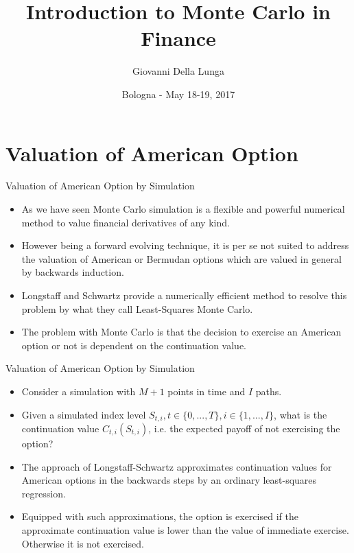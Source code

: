 \documentclass[11pt]{beamer}
\author{Giovanni Della Lunga}
\title{Introduction to Monte Carlo in Finance}
\institute{WORKSHOP IN QUANTITATIVE FINANCE}
\date{Bologna - May 18-19, 2017}
\begin{document}
\begin{frame}
\titlepage
\end{frame}


\section{Valuation of American Option}
\begin{frame}{Valuation of American Option by Simulation}
\begin{itemize}
\item As we have seen Monte Carlo simulation is a flexible and powerful numerical method to value financial derivatives of any kind. 
\item However being a forward evolving technique, it is per se not suited to address the valuation of American or Bermudan options which are valued in general by backwards induction. 
\item Longstaff and Schwartz provide a numerically efficient method to resolve this problem by what they call Least-Squares Monte Carlo. 
\item  The problem with Monte Carlo is that the decision to exercise an American option or not is dependent on the continuation value. 
\end{itemize}
\end{frame}
\begin{frame}{Valuation of American Option by Simulation}
\begin{itemize}
\item  Consider a simulation with $M + 1$ points in time and $I$ paths. 
\item Given a simulated index level $S_{t,i} , t\in \{0, ..., T \}, i \in \{1, ..., I \}$, what is the continuation value $C_{t,i}(S_{t,i})$, i.e. the expected payoff of not exercising the option? 
\item The approach of Longstaff-Schwartz approximates continuation values for American options in the backwards steps by an ordinary least-squares regression.
\item Equipped with such approximations, the option is exercised if the approximate continuation value is lower than the value of immediate exercise. Otherwise it is not exercised.
\end{itemize}
\end{frame}
\end{document}
